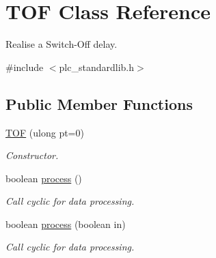 \hypertarget{class_t_o_f}{\section{T\+O\+F Class Reference}
\label{class_t_o_f}
}


Realise a Switch-\/\+Off delay.  




{\ttfamily \#include $<$plc\+\_\+standardlib.\+h$>$}

\subsection*{Public Member Functions}
\begin{DoxyCompactItemize}
\item 
\hyperlink{class_t_o_f_a2c7e1d7e4f237e3aeb174650e853d680}{T\+O\+F} (ulong pt=0)
\begin{DoxyCompactList}\small\item\em Constructor. \end{DoxyCompactList}\item 
\hypertarget{class_t_o_f_aaa214571b4daf4b953de11027bb76f02}{boolean \hyperlink{class_t_o_f_aaa214571b4daf4b953de11027bb76f02}{process} ()}\label{class_t_o_f_aaa214571b4daf4b953de11027bb76f02}

\begin{DoxyCompactList}\small\item\em Call cyclic for data processing. \end{DoxyCompactList}\item 
boolean \hyperlink{class_t_o_f_a4948e872fe2550eda0bac625d16a2536}{process} (boolean in)
\begin{DoxyCompactList}\small\item\em Call cyclic for data processing. \end{DoxyCompactList}\end{DoxyCompactItemize}
